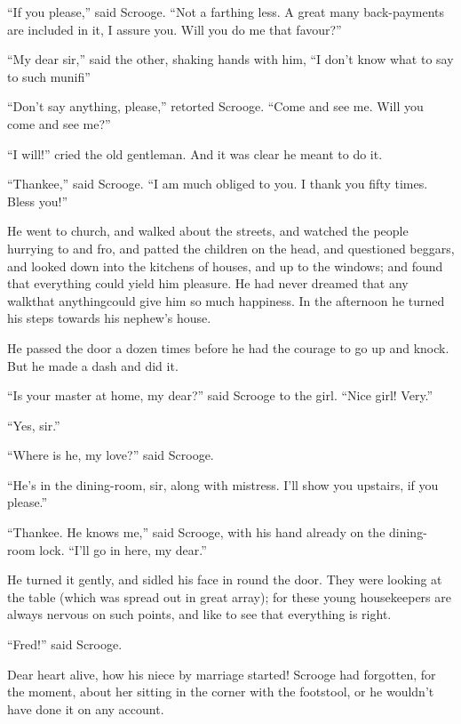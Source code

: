 \documentclass[paper=5.5in:8.5in,BCOR=5mm,twoside,DIV=calc,12pt,usegeometry]{scrbook} %
\begin{document}
\enquote{If you please,} said Scrooge. \enquote{Not a farthing less. A great many back-payments are included in it, I assure you. Will you do me that favour?}

\enquote{My dear sir,} said the other, shaking hands with him, \enquote{I don't know what to say to such munifi\textemdash \textemdash }

\enquote{Don't say anything, please,} retorted Scrooge. \enquote{Come and see me. Will you come and see me?}

\enquote{I will!} cried the old gentleman. And it was clear he meant to do it.

\enquote{Thankee,} said Scrooge. \enquote{I am much obliged to you. I thank you fifty times. Bless you!}

He went to church, and walked about the streets, and watched the people hurrying to and fro, and patted the children on the head, and questioned beggars, and looked down into the kitchens of houses, and up to the windows; and found that everything could yield him pleasure. He had never dreamed that any walk\textemdash that anything\textemdash could give him so much happiness. In the afternoon he turned his steps towards his nephew's house.

He passed the door a dozen times before he had the courage to go up and knock. But he made a dash and did it.

\enquote{Is your master at home, my dear?} said Scrooge to the girl. \enquote{Nice girl! Very.}

\enquote{Yes, sir.}

\enquote{Where is he, my love?} said Scrooge.

\enquote{He's in the dining-room, sir, along with mistress. I'll show you upstairs, if you please.}

\enquote{Thankee. He knows me,} said Scrooge, with his hand already on the dining-room lock. \enquote{I'll go in here, my dear.}

He turned it gently, and sidled his face in round the door. They were looking at the table (which was spread out in great array); for these young housekeepers are always nervous on such points, and like to see that everything is right.

\enquote{Fred!} said Scrooge.

Dear heart alive, how his niece by marriage started! Scrooge had forgotten, for the moment, about her sitting in the corner with the footstool, or he wouldn't have done it on any account.
\end{document}

